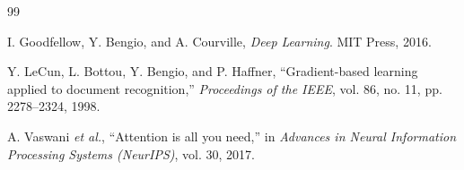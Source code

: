 
\begin{thebibliography}{99}

    I. Goodfellow, Y. Bengio, and A. Courville,
    \textit{Deep Learning}.
    MIT Press, 2016.

    Y. LeCun, L. Bottou, Y. Bengio, and P. Haffner,
    ``Gradient-based learning applied to document recognition,''
    \textit{Proceedings of the IEEE}, vol. 86, no. 11, pp. 2278--2324, 1998.

    A. Vaswani \textit{et al.},
    ``Attention is all you need,''
    in \textit{Advances in Neural Information Processing Systems (NeurIPS)},
    vol. 30, 2017.

\end{thebibliography}
